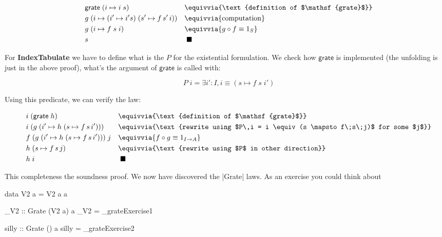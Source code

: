 \documentclass{article}
\begin{document}
\begin{equation}
\begin{aligned}
  \quad &\mathsf{grate}\;(i \mapsto i\; s) &&\equivvia{\text{definition of $\mathsf{grate}$}} \\
        & g\; (i \mapsto (i' \mapsto i' s) \; (s' \mapsto f\, s'\, i))
            &&\equivvia{\text{computation}} \\
        & g\; (i \mapsto f\;s\; i)
            &&\equivvia{g \circ f \equiv 1_S} \\
        &s  &&\;\blacksquare
\end{aligned}
\end{equation}

For \textbf{IndexTabulate} we have to define what is the $P$ for the
existential formulation. We check how $\mathsf{grate}$
is implemented (the unfolding is just in the above proof),
what's the argument of $\mathsf{grate}$ is called with:

\begin{equation}
\quad  P\;i = \exists i' : I, i \equiv (s \mapsto f\;s\;i')
\end{equation}

Using this predicate, we can verify the law:

\begin{equation}
\begin{aligned}
  \quad & i\;(\mathsf{grate}\;h) &&\equivvia{\text{definition of $\mathsf{grate}$}} \\
  &i\;(g\; (i' \mapsto h\; (s \mapsto f\, s\, i')))
      &&\equivvia{\text{rewrite using $P\,i = i \equiv (s \mapsto f\;s\;j)$ for some $j$}}\\
  &f\;(g\; (i' \mapsto h\; (s \mapsto f\, s\, i')))\;j
      &&\equivvia{f \circ g \equiv 1_{I\to A}} \\
  &h\; (s \mapsto f\, s\, j)
      &&\equivvia{\text{rewrite using $P$ in other direction}} \\
  &h\; i
      &&\;\blacksquare
\end{aligned}
\end{equation}

This completeness the soundness proof. We now have discovered the |Grate| laws.
As an exercise you could think about

\begin{code}
data V2 a = V2 a a

_V2 :: Grate (V2 a) a
_V2 = _grateExercise1

silly :: Grate () a
silly = _grateExercise2
\end{code}
\end{document}
